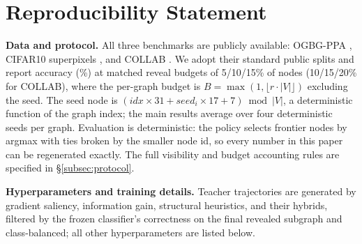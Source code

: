 
\section*{Reproducibility Statement}

\textbf{Data and protocol.} All three benchmarks are publicly available: OGBG-PPA , CIFAR10 superpixels , and COLLAB . We adopt their standard public splits and report accuracy (\%) at matched reveal budgets of 5/10/15\% of nodes (10/15/20\% for COLLAB), where the per-graph budget is $B=\max(1,\lfloor r\cdot|V|\rfloor)$ excluding the seed. The seed node is $(\mathit{idx}\times 31+\mathit{seed}_i\times 17+7)\bmod|V|$, a deterministic function of the graph index; the main results average over four deterministic seeds per graph. Evaluation is deterministic: the policy selects frontier nodes by argmax with ties broken by the smaller node id, so every number in this paper can be regenerated exactly. The full visibility and budget accounting rules are specified in \S\ref{subsec:protocol}.

\textbf{Hyperparameters and training details.} Teacher trajectories are generated by gradient saliency, information gain, structural heuristics, and their hybrids, filtered by the frozen classifier's correctness on the final revealed subgraph and class-balanced; all other hyperparameters are listed below.

